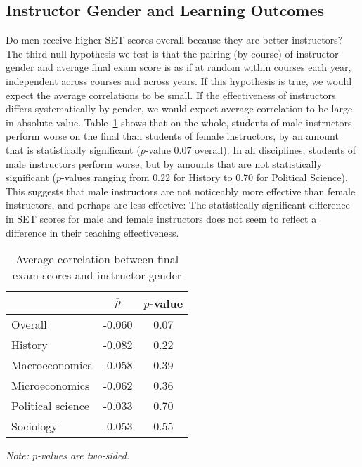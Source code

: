 \documentclass[12pt]{article}
\begin{document}
\subsection{Instructor Gender and Learning Outcomes} \label{sec:Fr-gender-final}
Do men receive higher SET scores overall because they are better instructors? 
The third null hypothesis we test is that the pairing (by course) of instructor gender and
average final exam score is as if at random within courses each year, independent
across courses and across years.
If this hypothesis is true, we would expect the average correlations to be small.
If the effectiveness of instructors differs systematically by gender,
we would expect average correlation to be large in absolute value. 
Table~\ref{tab:genderfinal} shows that on the whole, students of male instructors
perform worse on the final than students of female instructors, by an amount that 
is statistically significant ($p$-value $0.07$ overall).
In all disciplines, students of male instructors perform worse, 
but by amounts that are not statistically significant 
($p$-values ranging from $0.22$ for History to $0.70$ for Political Science).
This suggests that male instructors are not noticeably more effective than 
female instructors, and perhaps are less effective:
The statistically significant difference in SET scores for male and female instructors
does not seem to reflect a difference in their teaching effectiveness.


\begin{table}[htbp]
  \centering
  \footnotesize 
  \caption{Average correlation between final exam scores and instructor gender}
    \begin{tabular}{lcc}
    \toprule 
                     & $\bar{\rho}$  & $p$-value    \\
   \midrule
    Overall &            -0.060       & 0.07      \\
    History &            -0.082       & 0.22      \\
    Macroeconomics &     -0.058       & 0.39      \\
    Microeconomics &     -0.062       & 0.36      \\
    Political science &  -0.033       & 0.70      \\
    Sociology &          -0.053       & 0.55      \\
    \bottomrule
    \end{tabular}%
 \label{tab:genderfinal}%
 
  \textit{Note: $p$-values are two-sided.}
\end{table}%
\normalsize
\end{document}

